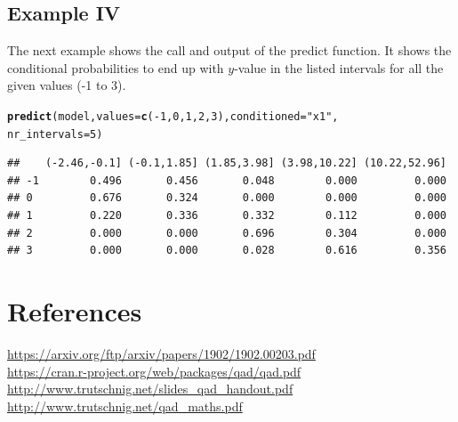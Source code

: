 \documentclass{scrartcl}\usepackage[]{graphicx}\usepackage[]{color}
\makeatletter
\newcommand{\hlnum}[1]{\textcolor[rgb]{0.686,0.059,0.569}{#1}}%
\newcommand{\hlstr}[1]{\textcolor[rgb]{0.192,0.494,0.8}{#1}}%
\newcommand{\hlopt}[1]{\textcolor[rgb]{0,0,0}{#1}}%
\newcommand{\hlstd}[1]{\textcolor[rgb]{0.345,0.345,0.345}{#1}}%
\newcommand{\hlkwc}[1]{\textcolor[rgb]{0.333,0.667,0.333}{#1}}%
\newcommand{\hlkwd}[1]{\textcolor[rgb]{0.737,0.353,0.396}{\textbf{#1}}}%
\newenvironment{kframe}{%
 \def\at@end@of@kframe{}%
 \ifinner\ifhmode%
  \def\at@end@of@kframe{\end{minipage}}%
  \begin{minipage}{\columnwidth}%
 \fi\fi%
 \def\FrameCommand##1{\hskip\@totalleftmargin \hskip-\fboxsep
 \colorbox{shadecolor}{##1}\hskip-\fboxsep
     \hskip-\linewidth \hskip-\@totalleftmargin \hskip\columnwidth}%
 \MakeFramed {\advance\hsize-\width
   \@totalleftmargin\z@ \linewidth\hsize
   \@setminipage}}%
 {\par\unskip\endMakeFramed%
 \at@end@of@kframe}
\newenvironment{knitrout}{}{} %
\makeatother
\begin{document}
\subsection{Example IV}
The next example shows the call and output of the predict function. It shows the conditional probabilities to end up with $y$-value in the listed intervals for all the given values (-1 to 3).
\begin{knitrout}
\color{fgcolor}\begin{kframe}
\begin{alltt}
\hlkwd{predict}\hlstd{(model,} \hlkwc{values} \hlstd{=} \hlkwd{c}\hlstd{(}\hlopt{-}\hlnum{1}\hlstd{,}\hlnum{0}\hlstd{,}\hlnum{1}\hlstd{,}\hlnum{2}\hlstd{,}\hlnum{3}\hlstd{),} \hlkwc{conditioned} \hlstd{=} \hlstr{"x1"}\hlstd{,}
        \hlkwc{nr_intervals} \hlstd{=} \hlnum{5}\hlstd{)}
\end{alltt}
\begin{verbatim}
##    (-2.46,-0.1] (-0.1,1.85] (1.85,3.98] (3.98,10.22] (10.22,52.96]
## -1        0.496       0.456       0.048        0.000         0.000
## 0         0.676       0.324       0.000        0.000         0.000
## 1         0.220       0.336       0.332        0.112         0.000
## 2         0.000       0.000       0.696        0.304         0.000
## 3         0.000       0.000       0.028        0.616         0.356
\end{verbatim}
\end{kframe}
\end{knitrout}

\section*{References}	
\url{https://arxiv.org/ftp/arxiv/papers/1902/1902.00203.pdf} \\
\url{https://cran.r-project.org/web/packages/qad/qad.pdf} \\
\url{http://www.trutschnig.net/slides_qad_handout.pdf} \\
\url{http://www.trutschnig.net/qad_maths.pdf} 
\end{document}
